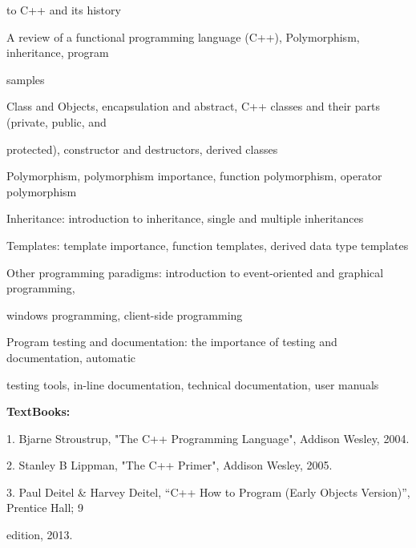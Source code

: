 \documentclass[12pt,a4paper]{article}
\begin{document}
to C++ and its history\par
A review of a functional programming language (C++), Polymorphism, inheritance, program\par
samples\par
Class and Objects, encapsulation and abstract, C++ classes and their parts (private, public, and\par
protected), constructor and destructors, derived classes\par
Polymorphism, polymorphism importance, function polymorphism, operator polymorphism\par
Inheritance: introduction to inheritance, single and multiple inheritances\par
Templates: template importance, function templates, derived data type templates\par
Other programming paradigms: introduction to event-oriented and graphical programming,\par
windows programming, client-side programming\par
Program testing and documentation: the importance of testing and documentation, automatic\par
testing tools, in-line documentation, technical documentation, user manuals\par\vspace{4pt}
\textbf{TextBooks:}\par\vspace{2pt}
1. Bjarne Stroustrup, "The C++ Programming Language", Addison Wesley, 2004.\par
2. Stanley B Lippman, "The C++ Primer", Addison Wesley, 2005.\par
3. Paul Deitel \& Harvey Deitel, “C++ How to Program (Early Objects Version)”, Prentice Hall; 9\par
edition, 2013.\par
\vspace{4pt}
\end{document}

